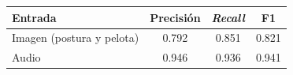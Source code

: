 \begin{tabular}{lccc}
\toprule
\textbf{Entrada} & \textbf{Precisión} & \textbf{\textit{Recall}} & \textbf{F1} \\
\midrule
Imagen (postura y pelota) & \num{0.792} & \num{0.851} & \num{0.821} \\
Audio & \num{0.946} & \num{0.936} & \num{0.941} \\
\bottomrule
\end{tabular}
